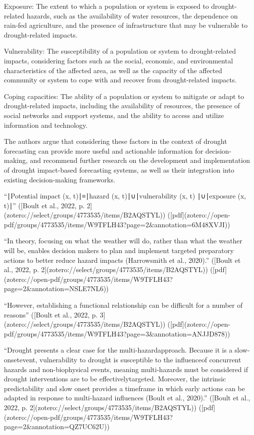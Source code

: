 {Exposure: The extent to which a population or system is exposed to drought-related hazards, such as the availability of water resources, the dependence on rain-fed agriculture, and the presence of infrastructure that may be vulnerable to drought-related impacts.

Vulnerability: The susceptibility of a population or system to drought-related impacts, considering factors such as the social, economic, and environmental characteristics of the affected area, as well as the capacity of the affected community or system to cope with and recover from drought-related impacts.

Coping capacities: The ability of a population or system to mitigate or adapt to drought-related impacts, including the availability of resources, the presence of social networks and support systems, and the ability to access and utilize information and technology.

The authors argue that considering these factors in the context of drought forecasting can provide more useful and actionable information for decision-making, and recommend further research on the development and implementation of drought impact-based forecasting systems, as well as their integration into existing decision-making frameworks.


“∣Potential impact (x, t)∣≡∣hazard (x, t)∣∪∣vulnerability (x, t) ∣∪∣exposure (x, t)∣” ([Boult et al., 2022, p. 2](zotero://select/groups/4773535/items/B2AQSTYL)) ([pdf](zotero://open-pdf/groups/4773535/items/W9TFLH43?page=2&annotation=6M48XVJI))

“In theory, focusing on what the weather will do, rather than what the weather will be, enables decision makers to plan and implement targeted preparatory actions to better reduce hazard impacts (Harrowsmith et al., 2020).” ([Boult et al., 2022, p. 2](zotero://select/groups/4773535/items/B2AQSTYL)) ([pdf](zotero://open-pdf/groups/4773535/items/W9TFLH43?page=2&annotation=NSLE7NL6))

“However, establishing a functional relationship can be difficult for a number of reasons” ([Boult et al., 2022, p. 3](zotero://select/groups/4773535/items/B2AQSTYL)) ([pdf](zotero://open-pdf/groups/4773535/items/W9TFLH43?page=3&annotation=ANJJD878))

“Drought presents a clear case for the multi-hazardapproach. Because it is a slow-onsetevent, vulnerability to drought is susceptible to the influenceof concurrent hazards and non-biophysical events, meaning multi-hazards must be considered if drought interventions are to be effectivelytargeted. Moreover, the intrinsic predictability and slow onset provides a timeframe in which early actions can be adapted in response to multi-hazard influences (Boult et al., 2020).” ([Boult et al., 2022, p. 2](zotero://select/groups/4773535/items/B2AQSTYL)) ([pdf](zotero://open-pdf/groups/4773535/items/W9TFLH43?page=2&annotation=QZ7UC62U))

}
